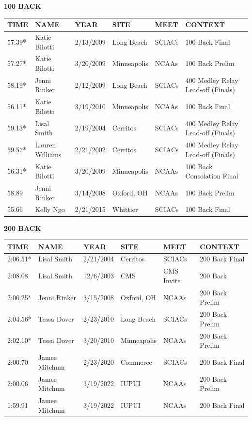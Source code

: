 \begin{table}[H]
\centering
\begin{minipage}[t]{0.48\textwidth}
\centering
\textbf{100 BACK}\\[0.1cm]
\begin{tabular}{@{}p{1.8cm}p{2.8cm}p{1.2cm}p{1.4cm}p{1.4cm}p{2.0cm}@{}}
\hline
    \textbf{TIME} & \textbf{NAME} & \textbf{YEAR} & \textbf{SITE} & \textbf{MEET} & \textbf{CONTEXT} \\
\hline
    57.39* & Katie Bilotti & 2/13/2009 & Long Beach & SCIACs & 100 Back Final \\
    57.27* & Katie Bilotti & 3/20/2009 & Minneapolis & NCAAs & 100 Back Prelim \\
    58.19* & Jenni Rinker & 2/12/2009 & Long Beach & SCIACs & 400 Medley Relay Lead-off (Finals) \\
    56.11* & Katie Bilotti & 3/19/2010 & Minneapolis & NCAAs & 100 Back Final \\
    59.13* & Lisal Smith & 2/19/2004 & Cerritos & SCIACs & 400 Medley Relay Lead-off (Finals) \\
    59.57* & Lauren Williams & 2/21/2002 & Cerritos & SCIACs & 400 Medley Relay Lead-off (Finals) \\
    56.31* & Katie Bilotti & 3/20/2009 & Minneapolis & NCAAs & 100 Back Consolation Final \\
    58.89 & Jenni Rinker & 3/14/2008 & Oxford, OH & NCAAs & 100 Back Prelim \\
    55.66 & Kelly Ngo & 2/21/2015 & Whittier & SCIACs & 100 Back Final \\
\hline
\end{tabular}
\end{minipage}\hfill
\begin{minipage}[t]{0.48\textwidth}
\centering
\textbf{200 BACK}\\[0.1cm]
\begin{tabular}{@{}p{1.8cm}p{2.8cm}p{1.2cm}p{1.4cm}p{1.4cm}p{2.0cm}@{}}
\hline
    \textbf{TIME} & \textbf{NAME} & \textbf{YEAR} & \textbf{SITE} & \textbf{MEET} & \textbf{CONTEXT} \\
\hline
    2:06.51* & Lisal Smith & 2/21/2004 & Cerritos & SCIACs & 200 Back Final \\
    2:08.08 & Lisal Smith & 12/6/2003 & CMS & CMS Invite & 200 Back \\
    2:06.25* & Jenni Rinker & 3/15/2008 & Oxford, OH & NCAAs & 200 Back Prelim \\
    2:04.56* & Tessa Dover & 2/23/2010 & Long Beach & SCIACs & 200 Back Prelim \\
    2:02.10* & Tessa Dover & 3/20/2010 & Minneapolis & NCAAs & 200 Back Prelim \\
    2:00.70 & Jamee Mitchum & 2/23/2020 & Commerce & SCIACs & 200 Back Final \\
    2:00.06 & Jamee Mitchum & 3/19/2022 & IUPUI & NCAAs & 200 Back Prelim \\
    1:59.91 & Jamee Mitchum & 3/19/2022 & IUPUI & NCAAs & 200 Back Final \\
\hline
\end{tabular}
\end{minipage}
\end{table}


